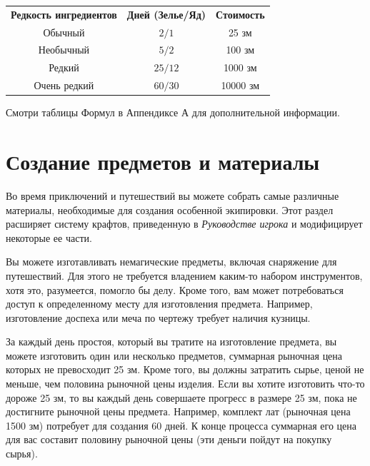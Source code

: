 \documentclass[a4paper, 9pt, twocolumn]{book}
\begin{document}
	\begin{table}[H]
		
		\centering
		
		\begin{tabularx}{\linewidth}{C C C}
			
			\textbf{Редкость ингредиентов} & \textbf{Дней (Зелье/Яд)} & \textbf{Стоимость} \\
			
			Обычный & $2/1$ & 25 зм \\
			
			Необычный & $5/2$ & 100 зм \\
			
			Редкий & $25/12$ & 1000 зм \\
			
			Очень редкий & $60/30$ & 10000 зм \\
			
		\end{tabularx}
		
	\end{table}
	
	
	
	Смотри таблицы Формул в Аппендиксе А для дополнительной информации.
	
	\chapter{Создание предметов и материалы}
	
	Во время приключений и путешествий вы можете собрать самые различные материалы, необходимые для создания особенной экипировки. Этот раздел расширяет систему крафтов, приведенную в \textit{Руководстве игрока} и модифицирует некоторые ее части.
	
	Вы можете изготавливать немагические предметы, включая снаряжение для путешествий. Для этого не требуется владением каким-то набором инструментов, хотя это, разумеется, помогло бы делу. Кроме того, вам может потребоваться доступ к определенному месту для изготовления предмета. Например, изготовление доспеха или меча по чертежу требует наличия кузницы.
	
	За каждый день простоя, который вы тратите на изготовление предмета, вы можете изготовить один или несколько предметов, суммарная рыночная цена которых не превосходит 25 зм. Кроме того, вы должны затратить сырье, ценой не меньше, чем половина рыночной цены изделия. Если вы хотите изготовить что-то дороже 25 зм, то вы каждый день совершаете прогресс в размере 25 зм, пока не достигните рыночной цены предмета. Например, комплект лат (рыночная цена 1500 зм) потребует для создания 60 дней. К конце процесса суммарная его цена для вас составит половину рыночной цены (эти деньги пойдут на покупку сырья).
	
\end{document}
